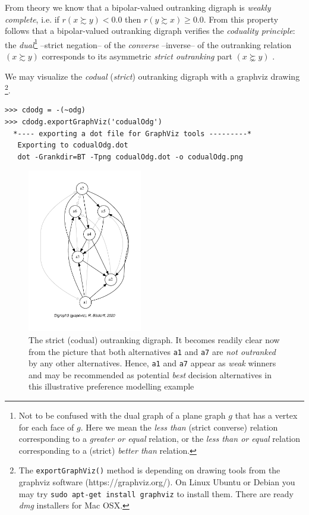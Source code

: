From theory we know that a bipolar-valued outranking digraph is \emph{weakly complete}, i.e. if $r(x \succsim y) < 0.0$ then $r(y \succsim x) \geq 0.0$. From this property follows that a bipolar-valued outranking digraph verifies the \emph{coduality principle}: the \emph{dual}\footnote{Not to be confused with the dual graph of a plane graph $g$ that has a vertex for each face of $g$. Here we mean the \emph{less than} (strict converse) relation corresponding to a \emph{greater or equal} relation, or the \emph{less than or equal} relation corresponding to a (strict) \emph{better than} relation.} --strict negation-- of the \emph{converse} --inverse-- of the outranking relation $(x \succsim y)$ corresponds to its asymmetric \emph{strict outranking} part $(x \succnsim y)$  \citep{BIS-2013, ADT-L7}.

We may visualize the \emph{codual} (\emph{strict}) outranking digraph with a graphviz drawing \footnote{The \texttt{exportGraphViz()} method is depending on drawing tools from the graphviz software (https://graphviz.org/). On Linux Ubuntu or Debian you may try \texttt{sudo apt-get install graphviz} to install them. There are ready \emph{dmg} installers for Mac OSX.}.
\begin{lstlisting}
>>> cdodg = -(~odg)
>>> cdodg.exportGraphViz('codualOdg')
  *---- exporting a dot file for GraphViz tools ---------*
   Exporting to codualOdg.dot
   dot -Grankdir=BT -Tpng codualOdg.dot -o codualOdg.png
\end{lstlisting}
\begin{figure}[ht]
\sidecaption[t]
\includegraphics[width=5cm]{Figures/3-1-codualOdg.pdf}
\caption[The strict (codual) outranking digraph]{The strict (codual) outranking digraph. It becomes readily clear now from the picture that both alternatives \texttt{a1}  and \texttt{a7} are \emph{not outranked} by any other alternatives. Hence, \texttt{a1}  and \texttt{a7} appear as \emph{weak} \Condorcet winners and may be recommended as potential \emph{best} decision alternatives in this illustrative preference modelling example}
\label{fig:3.1}       %
\end{figure}
 
